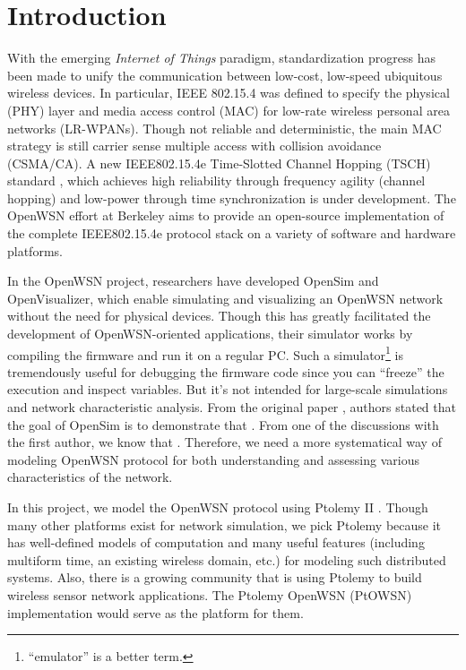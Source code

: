 \section{Introduction}
\label{sec:introduction}

With the emerging {\em Internet of Things} paradigm, standardization progress has been made to unify the communication between low-cost, low-speed ubiquitous wireless devices. In particular, IEEE 802.15.4 \cite{IEEE802.15.4} was defined to specify the physical (PHY) layer and media access control (MAC) for low-rate wireless personal area networks (LR-WPANs). Though not reliable and deterministic, the main MAC strategy is still carrier sense multiple access with collision avoidance (CSMA/CA). A new IEEE802.15.4e Time-Slotted Channel Hopping (TSCH) standard \cite{IEEE802.15.4e}, which achieves high reliability through frequency agility (channel hopping) and low-power through time synchronization is under development. The OpenWSN \cite{watteyne2012openwsn} effort at Berkeley aims to provide an open-source implementation of the complete IEEE802.15.4e protocol stack on a variety of software and hardware platforms. 

In the OpenWSN project, researchers have developed OpenSim and OpenVisualizer, which enable simulating and visualizing an OpenWSN network without the need for physical devices. Though this has greatly facilitated the development of OpenWSN-oriented applications, their simulator works by compiling the firmware and run it on a regular PC. Such a simulator\footnote{ ``emulator'' is a better term.} is tremendously useful for debugging the firmware code since you can ``freeze'' the execution and inspect variables. But it's not intended for large-scale simulations and network characteristic analysis. From the original paper \cite{watteyne2012openwsn}, authors stated that the goal of OpenSim is to demonstrate that . From one of the discussions with the first author, we know that . Therefore, we need a more systematical way of modeling OpenWSN protocol for both understanding and assessing various characteristics of the network. 

In this project, we model the OpenWSN protocol using Ptolemy II \cite{PtolemyVol1:04, davis1999overview}. Though many other platforms \cite{mccanne1995ns, varga2001omnet++} exist for network simulation, we pick Ptolemy because it has well-defined models of computation and many useful features (including multiform time, an existing wireless domain, etc.) for modeling such distributed systems. Also, there is a growing community that is using Ptolemy to build wireless sensor network applications. The Ptolemy OpenWSN (PtOWSN) implementation would serve as the platform for them. 


